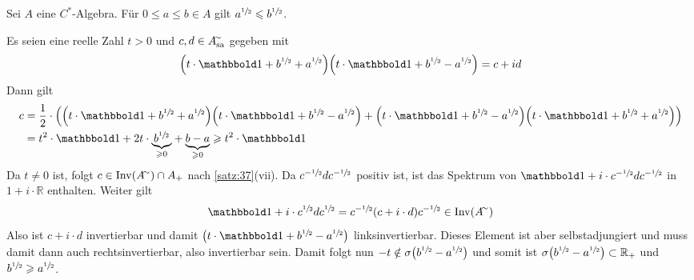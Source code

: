 \begin{satz}[{name=[Die Wurzel ist monoton]}]
	Sei $A$ eine $C^*$-Algebra. Für $0 \le a \le b \in A$ gilt $a^{\sfrac{1}{2}} \leqslant b^{\sfrac{1}{2}}$.
\end{satz}
\begin{beweis}
	Es seien eine reelle Zahl $t >0$ und $c,d \in A_\sa^\simm$ gegeben mit 
	\[
		\enbrace*{t \cdot \ind + b^{\sfrac{1}{2}} + a^{\sfrac{1}{2}}} \enbrace*{t \cdot \ind + b^{\sfrac{1}{2}} - a^{\sfrac{1}{2}}} = c + i d
	\]
	Dann gilt 
	\begin{align}
		c &=\frac{1}{2} \cdot \enbrace*{\enbrace*{t \cdot \ind + b^{\sfrac{1}{2}} + a^{\sfrac{1}{2}}}\enbrace*{t \cdot \ind + b^{\sfrac{1}{2}} -a^{\sfrac{1}{2}}} 
		+ \enbrace*{t \cdot \ind + b^{\sfrac{1}{2}}-a^{\sfrac{1}{2}}} \enbrace*{t \cdot \ind + b^{\sfrac{1}{2}} + a^{\sfrac{1}{2}}} } \\
		&= t^2 \cdot \ind + 2 t \cdot \Underbrace{b^{\sfrac{1}{2}}}{\ge 0} + \Underbrace{b -a}{\ge 0} \ge t^2 \cdot \ind
	\end{align}
	Da $t\neq 0$ ist, folgt $c \in \Inv(A^\simm) \cap A_+$ nach \autoref{satz:37}(vii). Da $c^{-\sfrac{1}{2}}d c^{-\sfrac{1}{2}}$ positiv ist, ist das Spektrum von 
	$\ind + i \cdot c^{-\sfrac{1}{2}}d c^{-\sfrac{1}{2}}$ in $1+ i \cdot \mathbb{R}$ enthalten. Weiter gilt
	\[
		\ind + i \cdot c^{\sfrac{1}{2}}d c^{\sfrac{1}{2}} = c^{-\sfrac{1}{2}}(c + i \cdot d) c^{-\sfrac{1}{2}} \in \Inv(A^\simm)
	\]
	Also ist $c+ i \cdot d$ invertierbar und damit $\enbrace*{t \cdot \ind + b^{\sfrac{1}{2}} - a^{\sfrac{1}{2}}}$ linksinvertierbar. 
	Dieses Element ist aber selbstadjungiert und muss damit dann auch rechtsinvertierbar, also invertierbar sein. 
	Damit folgt nun $-t \notin \sigma \enbrace*{b^{\sfrac{1}{2}} - a^{\sfrac{1}{2}}}$ und somit ist $\sigma \enbrace*{b^{\sfrac{1}{2}} - a^{\sfrac{1}{2}}} \subset \mathbb{R}_+$ und $b^{\sfrac{1}{2}} \geqslant a^{\sfrac{1}{2}}$.
\end{beweis}

